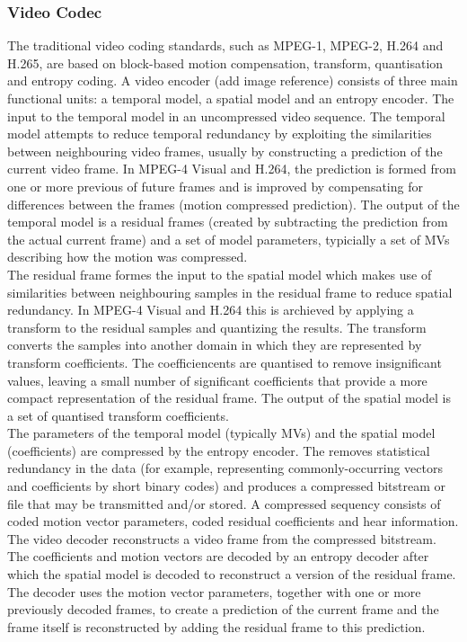 \subsubsection{Video Codec}
The traditional video coding standards, such as MPEG-1, MPEG-2, H.264 and H.265, are based on block-based motion compensation, transform, quantisation and entropy coding. A video encoder (add image reference) consists of three main functional units: a temporal model, a spatial model and an entropy encoder. The input to the temporal model in an uncompressed video sequence. The temporal model attempts to reduce temporal redundancy by exploiting the similarities between neighbouring video frames, usually by constructing a prediction of the current video frame. In MPEG-4 Visual and H.264, the prediction is formed from one or more previous of future frames and is improved by compensating for differences between the frames (motion compressed prediction). The output of the temporal model is a residual frames (created by subtracting the prediction from the actual current frame) and a set of model parameters, typicially a set of MVs describing how the motion was compressed. \\
The residual frame formes the input to the spatial model which makes use of similarities between neighbouring samples in the residual frame to reduce spatial redundancy. In MPEG-4 Visual and H.264 this is archieved by applying a transform to the residual samples and quantizing the results. The transform converts the samples into another domain in which they are represented by transform coefficients. The coefficiencents are quantised to remove insignificant values, leaving a small number of significant coefficients that provide a more compact representation of the residual frame. The output of the spatial model is a set of quantised transform coefficients.\\
The parameters of the temporal model (typically MVs) and the spatial model (coefficients) are compressed by the entropy encoder. The removes statistical redundancy in the data (for example, representing commonly-occurring  vectors and coefficients by short binary codes) and produces a compressed bitstream or file that may be transmitted and/or stored. A compressed sequency consists of coded motion vector parameters, coded residual coefficients and hear information.\\
The video decoder reconstructs a video frame from the compressed bitstream. The coefficients and motion vectors are decoded by an entropy decoder after which the spatial model is decoded to reconstruct a version of the residual frame. The decoder uses the motion vector parameters, together with one or more previously decoded frames, to create a prediction of the current frame and the frame itself is reconstructed by adding the residual frame to this prediction.
